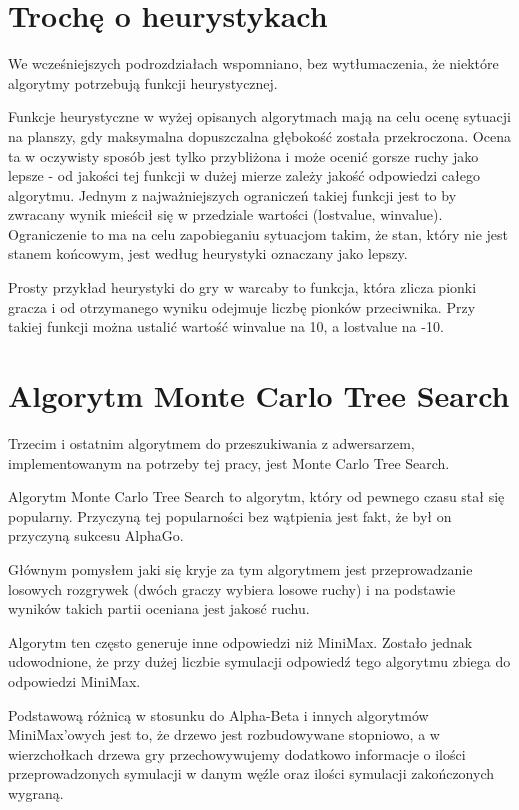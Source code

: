 \documentclass[polish,shortabstract,inz]{iithesis}
\begin{document}
\section{Trochę o heurystykach}
We wcześniejszych podrozdziałach wspomniano, bez wytłumaczenia, że niektóre algorytmy potrzebują funkcji heurystycznej.

Funkcje heurystyczne w wyżej opisanych algorytmach mają na celu ocenę sytuacji na planszy, gdy maksymalna dopuszczalna głębokość została przekroczona.
Ocena ta w oczywisty sposób jest tylko przybliżona i może ocenić gorsze ruchy jako lepsze - od jakości tej funkcji w dużej mierze zależy jakość odpowiedzi całego algorytmu.
Jednym z najważniejszych ograniczeń takiej funkcji jest to by zwracany wynik mieścił się w przedziale wartości (lost\textunderscore value, win\textunderscore value).
Ograniczenie to ma na celu zapobieganiu sytuacjom takim, że stan, który nie jest stanem końcowym, jest według heurystyki oznaczany jako lepszy.

Prosty przykład heurystyki do gry w warcaby to funkcja, która zlicza pionki gracza i od otrzymanego wyniku odejmuje liczbę pionków przeciwnika.
Przy takiej funkcji można ustalić wartość win\textunderscore value na 10, a lost\textunderscore value na -10.

\section{Algorytm Monte Carlo Tree Search}
Trzecim i ostatnim algorytmem do przeszukiwania z adwersarzem, implementowanym na potrzeby tej pracy, jest Monte Carlo Tree Search.

Algorytm Monte Carlo Tree Search to algorytm, który od pewnego czasu stał się popularny.
Przyczyną tej popularności bez wątpienia jest fakt, że był on przyczyną sukcesu AlphaGo.

Głównym pomysłem jaki się kryje za tym algorytmem jest przeprowadzanie losowych rozgrywek (dwóch graczy wybiera losowe ruchy) i na podstawie wyników takich partii oceniana jest jakosć ruchu.

Algorytm ten często generuje inne odpowiedzi niż MiniMax.
Zostało jednak udowodnione, że przy dużej liczbie symulacji odpowiedź tego algorytmu zbiega do odpowiedzi MiniMax.

Podstawową różnicą w stosunku do Alpha-Beta i innych algorytmów MiniMax'owych jest to, że drzewo jest rozbudowywane stopniowo, a w wierzchołkach drzewa gry przechowywujemy dodatkowo informacje o ilości przeprowadzonych symulacji w danym węźle oraz ilości symulacji zakończonych wygraną.
\end{document}
